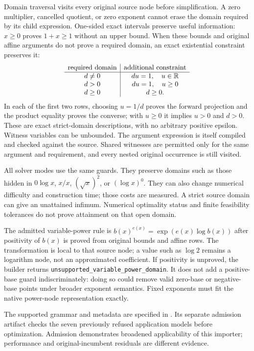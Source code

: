 Domain traversal visits every original source node before simplification.
A zero multiplier, cancelled quotient, or zero exponent cannot erase the
domain required by its child expression. One-sided exact intervals preserve
useful information: $x\ge0$ proves $1+x\ge1$ without an upper bound.
When these bounds and original affine arguments do not prove a required
domain, an exact existential constraint preserves it:
\[
\begin{array}{c|c}
\text{required domain}&\text{additional constraint}\\\hline
d\ne0&du=1,\quad u\in\mathbb R\\
d>0&du=1,\quad u\ge0\\
d\ge0&d\ge0.
\end{array}
\]
In each of the first two rows, choosing $u=1/d$ proves the forward
projection and the product equality proves the converse; with $u\ge0$
it implies $u>0$ and $d>0$. These are exact strict-domain descriptions,
with no arbitrary positive epsilon. Witness variables can be unbounded.
The argument expression is itself compiled and checked against the source.
Shared witnesses are permitted only for the same argument and requirement,
and every nested original occurrence is still visited.

All solver modes use the same guards. They preserve domains such as those
hidden in $0\log x$, $x/x$, $(\sqrt{x})^2$, or $(\log x)^0$.
They can also change numerical difficulty and construction time; those
costs are measured. A strict source domain can give an unattained infimum.
Numerical optimality status and finite feasibility tolerances do not prove
attainment on that open domain.

The admitted variable-power rule is
$b(x)^{e(x)}=\exp(e(x)\log b(x))$ after positivity of $b(x)$ is
proved from original bounds and affine rows. The transformation is local
to that source node; a value such as $\log2$ remains a logarithm node,
not an approximated coefficient. If positivity is unproved, the builder
returns \texttt{unsupported\_variable\_power\_domain}. It does not
add a positive-base guard indiscriminately: doing so could remove valid
zero-base or negative-base points under broader exponent semantics.
Fixed exponents must fit the native power-node representation exactly.

The supported grammar and metadata are specified in
.
Its separate admission artifact checks the seven previously refused
application models before optimization. Admission demonstrates broadened
applicability of this importer; performance and original-incumbent residuals
are different evidence.


